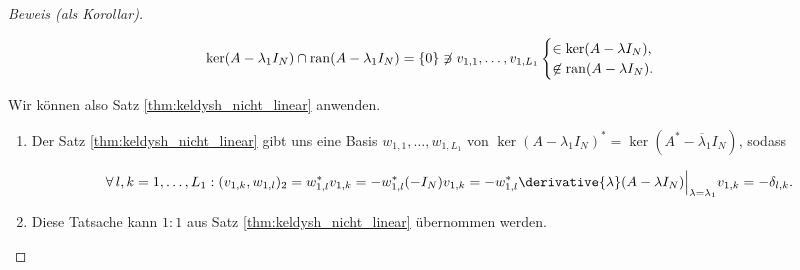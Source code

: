 \begin{proof}[Beweis (als Korollar)]
\begin{enumerate}[label = \arabic*.]
        \begin{align*}
            \ker (A - \lambda_1 I_N) \cap \operatorname{ran} (A - \lambda_1 I_N)
            =
            {\left \{ 0 \right \}}
            \not \ni
            v_{1, 1}, \dots, v_{1, L_1}
            \begin{cases}
                     \in \ker (A - \lambda I_N), \\
                \not \in \operatorname{ran} (A - \lambda I_N).
            \end{cases}
        \end{align*}
    
    \end{enumerate}

    Wir können also Satz \ref{thm:keldysh_nicht_linear} anwenden.
    
    \begin{enumerate}[label = (\roman*), start = 2]

        \item Der Satz \ref{thm:keldysh_nicht_linear} gibt uns eine Basis $w_{1, 1}, \dots, w_{1, L_1}$ von $\ker (A - \lambda_1 I_N)^\ast = \ker (A^\ast - \overline \lambda_1 I_N)$, sodass
        
        \begin{align*}
            \Forall l, k = 1, \dots, L_1:
                (v_{1, k}, w_{1, l})_2
                =
                w_{1, l}^\ast v_{1, k}
                =
                -w_{1, l}^\ast (-I_N) v_{1, k}
                =
                -w_{1, l}^\ast \derivative{\lambda}(A - \lambda I_N) \Big |_{\lambda = \lambda_1} v_{1, k}
                =
                -\delta_{l, k}.
        \end{align*}

        \item Diese Tatsache kann $1 : 1$ aus Satz \ref{thm:keldysh_nicht_linear} übernommen werden.

    \end{enumerate}
    
\end{proof}
